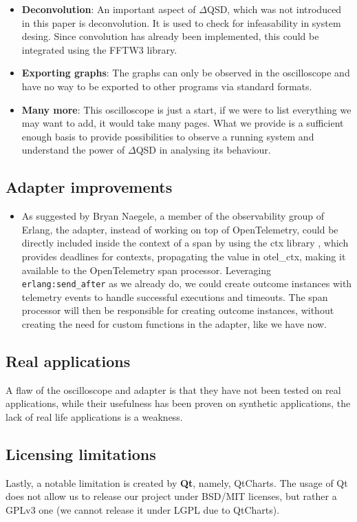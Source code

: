 \begin{itemize}
                \item \textbf{Deconvolution}: An important aspect of $\Delta$QSD, which was not introduced in this paper is deconvolution. It is used to check for infeasability in system desing. Since convolution has already been implemented, this could be integrated using the FFTW3 library. 

                \item \textbf{Exporting graphs}: The graphs can only be observed in the oscilloscope and have no way to be exported to other programs via standard formats.

                \item \textbf{Many more}: This oscilloscope is just a start, if we were to list everything we may want to add, it would take many pages. What we provide is a sufficient enough basis to provide possibilities to observe a running system and understand the power of $\Delta$QSD in analysing its behaviour.
           \end{itemize} 
                
      \subsection{Adapter improvements}

        \begin{itemize}
            \item As suggested by Bryan Naegele, a member of the observability group of Erlang, the adapter, instead of working on top of OpenTelemetry, could be directly included inside the context of a span by using the ctx library \cite{ctx}, which provides deadlines for contexts, propagating the value in otel\_ctx, making it available to the OpenTelemetry span processor. Leveraging \texttt{erlang:send\_after} as we already do, we could create outcome instances with telemetry events to handle successful executions and timeouts. The span processor will then be responsible for creating outcome instances, without creating the need for custom functions in the adapter, like we have now.
        \end{itemize}
   
    \subsection{Real applications}
        A flaw of the oscilloscope and adapter is that they have not been tested on real applications, while their usefulness has been proven on synthetic applications, the lack of real life applications is a weakness.

    \subsection{Licensing limitations}
    Lastly, a notable limitation is created by \textbf{Qt}, namely, QtCharts. The usage of Qt does not allow us to release our project under BSD/MIT licenses, but rather a GPLv3 one (we cannot release it under LGPL due to QtCharts). \cite{qt-gpl}

